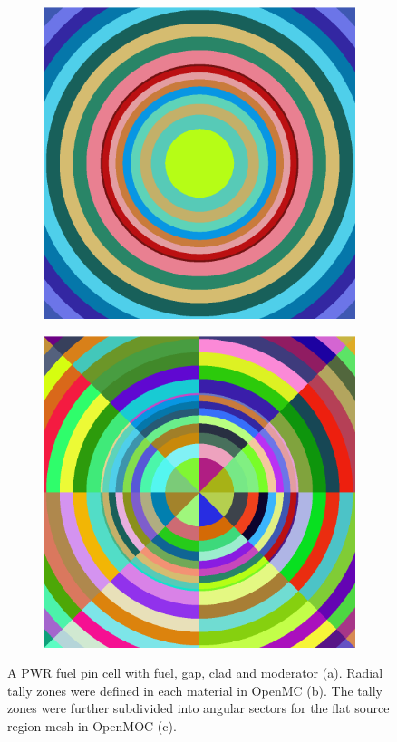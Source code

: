 \begin{figure}[H]
\begin{subfigure}{.32\textwidth}
  \includegraphics[width=0.9\linewidth]{figures/biases/pin-cell/pin-cell-8x}
  \caption{}
\end{subfigure}
\begin{subfigure}{.32\textwidth}
  \centering
  \includegraphics[width=0.9\linewidth]{figures/biases/pin-cell/pin-cell-8x8}
  \caption{}
\end{subfigure}
\caption[Pin cell materials and geometry]{A PWR fuel pin cell with fuel, gap, clad and moderator (a). Radial tally zones were defined in each material in OpenMC (b). The tally zones were further subdivided into angular sectors for the flat source region mesh in OpenMOC (c).}
\label{fig:chap4-pin-cell}
\end{figure}

